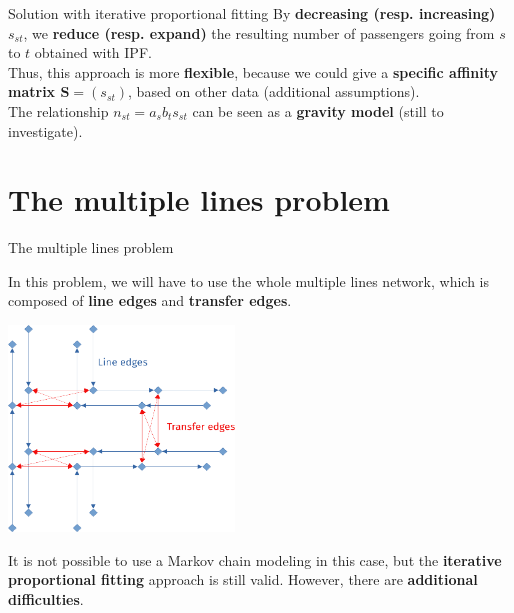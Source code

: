 \documentclass[10pt]{beamer}
\newcommand{\imp}[1]{\textbf{\color{cyan}#1}}
\begin{document}
	
	\begin{frame}{Solution with iterative proportional fitting}
		By \imp{decreasing (resp. increasing) $s_{st}$}, we \imp{reduce (resp. expand)} the resulting number of passengers going from $s$ to $t$ obtained with IPF. \\
		\vspace{0.4cm}
		Thus, this approach is more \imp{flexible}, because we could give a \imp{specific affinity matrix $\mathbf{S} = (s_{st})$}, based on other data (additional assumptions).\\
		\vspace{0.4cm}
		The relationship $n_{st} = a_s b_t s_{st}$ can be seen as a \imp{gravity model} (still to investigate).
	\end{frame}
		
	
	\section{The multiple lines problem}
	
	
	\begin{frame}{The multiple lines problem}
		
		In this problem, we will have to use the whole multiple lines network, which is composed of \imp{line edges} and \imp{transfer edges}.
		
		\begin{center}
			\includegraphics[width=0.45\textwidth]{img/edge_type2.png}
		\end{center}
	
		It is not possible to use a Markov chain modeling in this case, but the \imp{iterative proportional fitting} approach is still valid. However, there are \imp{additional difficulties}.
		
	\end{frame}
	
\end{document}
